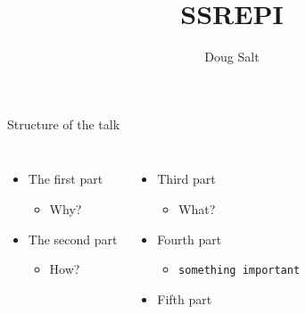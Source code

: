\documentclass[usenames,dvipsnames,10pt]{beamer}
\title{SSREPI}
\author{Doug Salt}
\institute{The James Hutton Institute}
\begin{document}
\begin{frame}[plain]
    \maketitle
\end{frame}

\begin{frame}{Structure of the talk}

    \begin{columns}
            \begin{itemize}
                \item The first part
                    \begin{itemize}
                        \item Why?
                    \end{itemize}
                \item The second part
                    \begin{itemize}
                        \item How?
                    \end{itemize}
            \end{itemize}
            \begin{itemize}
                \item Third part
                    \begin{itemize}
                        \item What?
                    \end{itemize}
                \item Fourth part
                    \begin{itemize}
                        \item {\color{red}\texttt{something important}}
                    \end{itemize}
                \item Fifth part
            \end{itemize}
    \end{columns}
\end{frame}
\end{document}
